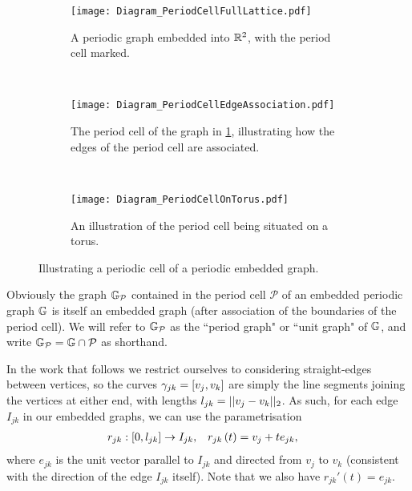 \begin{figure}[b!]
	\centering
	\begin{subfigure}[t]{0.45\textwidth}
		\centering
		\texttt{[image: Diagram\_PeriodCellFullLattice.pdf]}
		\caption{\label{fig:Diagram_PeriodCellFullLattice} A periodic graph embedded into $\mathbb{R}^2$, with the period cell marked.}
	\end{subfigure}
	~
	\begin{subfigure}[t]{0.45\textwidth}
		\centering
		\texttt{[image: Diagram\_PeriodCellEdgeAssociation.pdf]}
		\caption{\label{fig:Diagram_PeriodCellEdgeAssociation} The period cell of the graph in \ref{fig:Diagram_PeriodCellFullLattice}, illustrating how the edges of the period cell are associated.}
	\end{subfigure}
	\\
	\begin{subfigure}[b]{0.75\textwidth}
		\centering
		\texttt{[image: Diagram\_PeriodCellOnTorus.pdf]}
		\caption{\label{fig:Diagram_PeriodCellOnTorus} An illustration of the period cell being situated on a torus.}
	\end{subfigure}
	\caption{\label{fig:PeriodCellIllustration} Illustrating a periodic cell of a periodic embedded graph.}
\end{figure} 
Obviously the graph $\mathbb{G}_{\mathcal{P}}$ contained in the period cell $\mathcal{P}$ of an embedded periodic graph $\mathbb{G}$ is itself an embedded graph (after association of the boundaries of the period cell). 
We will refer to $\mathbb{G}_{\mathcal{P}}$ as the ``period graph" or ``unit graph" of $\mathbb{G}$, and write $\mathbb{G}_{\mathcal{P}} = \mathbb{G} \cap \mathcal{P}$ as shorthand. \newline

In the work that follows we restrict ourselves to considering straight-edges between vertices, so the curves $\gamma_{jk} = \left[ v_j, v_k \right]$ are simply the line segments joining the vertices at either end, with lengths $l_{jk} = \lvert\lvert v_j-v_k \rvert\rvert_2$.
As such, for each edge $I_{jk}$ in our embedded graphs, we can use the parametrisation
\begin{align} \label{eq:EdgeParameterisation}
	r_{jk}:\left[ 0, l_{jk} \right] \rightarrow I_{jk},
	&\quad r_{jk}\left( t \right) = v_j + te_{jk},
\end{align}
where $e_{jk}$ is the unit vector parallel to $I_{jk}$ and directed from $v_j$ to $v_k$ (consistent with the direction of the edge $I_{jk}$ itself).
Note that we also have $r_{jk}'(t) = e_{jk}$.

